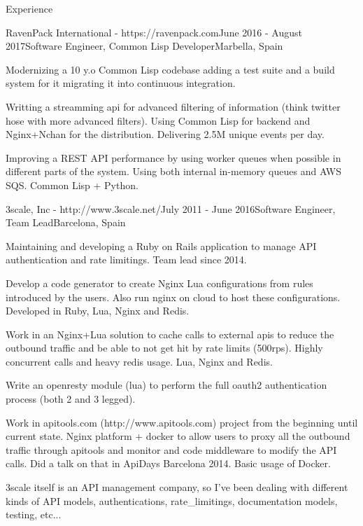 \documentclass{resume} %
\begin{document}
\begin{rSection}{Experience}
\begin{rSubsection}{RavenPack International - https://ravenpack.com}{June 2016  - August 2017}{Software Engineer, Common Lisp Developer}{Marbella, Spain}
\item Modernizing a 10 y.o Common Lisp codebase adding a test suite
  and a build system for it migrating it into continuous
  integration.
\item Writting a streamming api for advanced filtering of information
  (think twitter hose with more advanced filters). Using Common Lisp
  for backend and Nginx+Nchan for the distribution.  Delivering 2.5M
  unique events per day.
\item Improving a REST API performance by using worker queues when
  possible in different parts of the system. Using both internal
  in-memory queues and AWS SQS. Common Lisp + Python.
\end{rSubsection}

\begin{rSubsection}{3scale, Inc - http://www.3scale.net/}{July 2011 - June 2016}{Software Engineer, Team Lead}{Barcelona, Spain}
\item Maintaining and developing a Ruby on Rails application to manage
  API authentication and rate limitings. Team lead since 2014.
\item Develop a code generator to create Nginx Lua configurations from
  rules introduced by the users. Also run nginx on cloud to host these
  configurations. Developed in Ruby, Lua, Nginx and Redis.
\item Work in an Nginx+Lua solution to cache calls to external apis to
  reduce the outbound traffic and be able to not get hit by rate
  limits (500rps). Highly concurrent calls and heavy redis usage. Lua,
  Nginx and Redis.
\item Write an openresty module (lua) to perform the full oauth2
  authentication process (both 2 and 3 legged).
\item Work in apitools.com (http://www.apitools.com) project from the
  beginning until current state. Nginx platform + docker to allow
  users to proxy all the outbound traffic through apitools and monitor
  and code middleware to modify the API calls. Did a talk on that in
  ApiDays Barcelona 2014. Basic usage of Docker.
\item 3scale itself is an API management company, so I've been dealing
  with different kinds of API models, authentications,
  rate\_limitings, documentation models, testing, etc...
\end{rSubsection}


\end{rSection}
\end{document}
